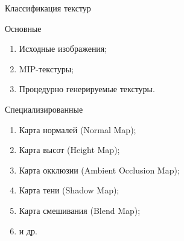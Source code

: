 \documentclass{beamer}
\begin{document}
	\begin{frame}{Классификация текстур}

		Основные
		\begin{enumerate}
			\item Исходные изображения;
			\item MIP-текстуры;
			\item Процедурно генерируемые текстуры. %
		\end{enumerate}
		
		Специализированные
		\begin{enumerate}
			\item Карта нормалей (Normal Map);
			\item Карта высот (Height Map);
			
			\item Карта окклюзии (Ambient Occlusion Map);
			\item Карта тени (Shadow Map);
		
			\item Карта смешивания (Blend Map);
			\item и др.
		\end{enumerate}

	\end{frame}
\end{document}
